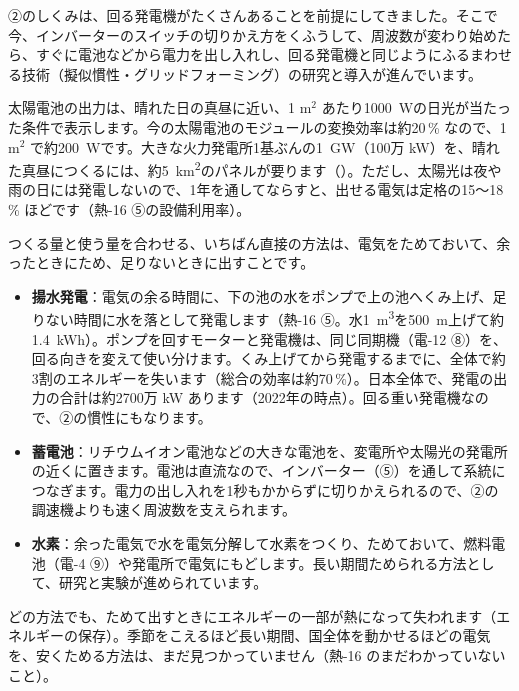 ②のしくみは、回る発電機がたくさんあることを前提にしてきました。そこで今、インバーターのスイッチの切りかえ方をくふうして、周波数が変わり始めたら、すぐに電池などから電力を出し入れし、回る発電機と同じようにふるまわせる技術（擬似慣性・グリッドフォーミング）の研究と導入が進んでいます。

太陽電池の出力は、晴れた日の真昼に近い、1 m$^2$ あたり\qty{1000}{W}の日光が当たった条件で表示します。今の太陽電池のモジュールの変換効率は約20\,\% なので、1 m$^2$ で約\qty{200}{W}です。大きな火力発電所1基ぶんの\qty{1}{GW}（100万 kW）を、晴れた真昼につくるには、約\qty{5}{km^2}のパネルが要ります（）。ただし、太陽光は夜や雨の日には発電しないので、1年を通してならすと、出せる電気は定格の15〜18\,\% ほどです（熱-16 ⑤の設備利用率）。

\leavevmode\label{ph:電-16:sec8}つくる量と使う量を合わせる、いちばん直接の方法は、電気をためておいて、余ったときにため、足りないときに出すことです。
\begin{itemize}[leftmargin=1.2\zw, itemsep=2pt, topsep=2pt, label={\color{bkTheme}●}]
\item \textbf{揚水発電}：電気の余る時間に、下の池の水をポンプで上の池へくみ上げ、足りない時間に水を落として発電します（熱-16 ⑤。水\qty{1}{m^3}を\qty{500}{m}上げて約\qty{1.4}{kWh}）。ポンプを回すモーターと発電機は、同じ同期機（電-12 ⑧）を、回る向きを変えて使い分けます。くみ上げてから発電するまでに、全体で約3割のエネルギーを失います（総合の効率は約70\,\%）。日本全体で、発電の出力の合計は約2700万 kW あります（2022年の時点）。回る重い発電機なので、②の慣性にもなります。
\item \textbf{蓄電池}：リチウムイオン電池などの大きな電池を、変電所や太陽光の発電所の近くに置きます。電池は直流なので、インバーター（⑤）を通して系統につなぎます。電力の出し入れを1秒もかからずに切りかえられるので、②の調速機よりも速く周波数を支えられます。
\item \textbf{水素}：余った電気で水を電気分解して水素をつくり、ためておいて、燃料電池（電-4 ⑨）や発電所で電気にもどします。長い期間ためられる方法として、研究と実験が進められています。
\end{itemize}
\noindent どの方法でも、ためて出すときにエネルギーの一部が熱になって失われます（エネルギーの保存）。季節をこえるほど長い期間、国全体を動かせるほどの電気を、安くためる方法は、まだ見つかっていません（熱-16 のまだわかっていないこと）。

